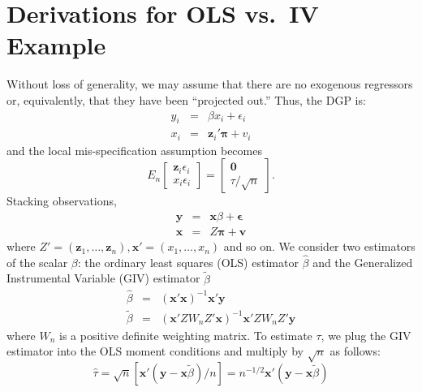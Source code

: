 \documentclass[12pt]{article}
\theoremstyle{definition}
\begin{document}
\section{Derivations for OLS vs.\ IV Example}
Without loss of generality, we may assume that there are no exogenous regressors or, equivalently, that they have been ``projected out.'' Thus, the DGP is: 
    	\begin{eqnarray}
			y_{i} &=& \beta x_{i}  + \epsilon_{i}\\
	x_{i} &=& \mathbf{z}_{i}' \boldsymbol{\pi} + v_{i}
		\end{eqnarray}
and the local mis-specification assumption becomes
  \begin{equation}
    E_n \left[\begin{array}{c} \mathbf{z}_i \epsilon_i \\ x_i \epsilon_i \end{array}\right] = \left[\begin{array}{c} \mathbf{0} \\ \tau/\sqrt{n} \end{array}\right].
  \end{equation}
Stacking observations,
\begin{eqnarray}
    \mathbf{y} &=& \mathbf{x}\beta + \boldsymbol{\epsilon}\\
    \mathbf{x} &=& Z\boldsymbol{\pi} + \mathbf{v}
\end{eqnarray}
where $Z' = (\mathbf{z}_{1}, \hdots, \mathbf{z}_{n}), \mathbf{x}' = (x_{1}, \hdots, x_{n})$ and so on. We consider two estimators of the scalar $\beta$: the ordinary least squares (OLS) estimator $\widehat{\beta}$ and the Generalized Instrumental Variable (GIV) estimator $\widetilde{\beta}$
  \begin{eqnarray}
		\widehat{\beta} &=& \left(\mathbf{x}'\mathbf{x}\right)^{-1}\mathbf{x}'\mathbf{y}\\
		\widetilde{\beta} &=& \left(\mathbf{x}'Z W_n Z'\mathbf{x}\right)^{-1}\mathbf{x}'Z W_nZ'\mathbf{y}
	\end{eqnarray}
where $W_n$ is a positive definite weighting matrix. To estimate $\tau$, we plug the GIV estimator into the OLS moment conditions and multiply by $\sqrt{n}$ as follows:
  \begin{equation}
     \widehat{\tau} = \sqrt{n} \left[\mathbf{x}'(\mathbf{y} - \mathbf{x}\widetilde{\beta})/n\right] = n^{-1/2}\mathbf{x}'(\mathbf{y} - \mathbf{x}\widetilde{\beta})
   \end{equation} 
\end{document}
